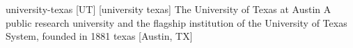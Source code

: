 \newglsXinstitution%
{university-texas}%
[UT]%
[university texas]%
{The University of Texas at Austin}%
{A public research university and the flagship institution of the University of Texas System, founded in 1881 \cite{website:University_of_Texas}}%
{texas}%
[Austin, TX]%